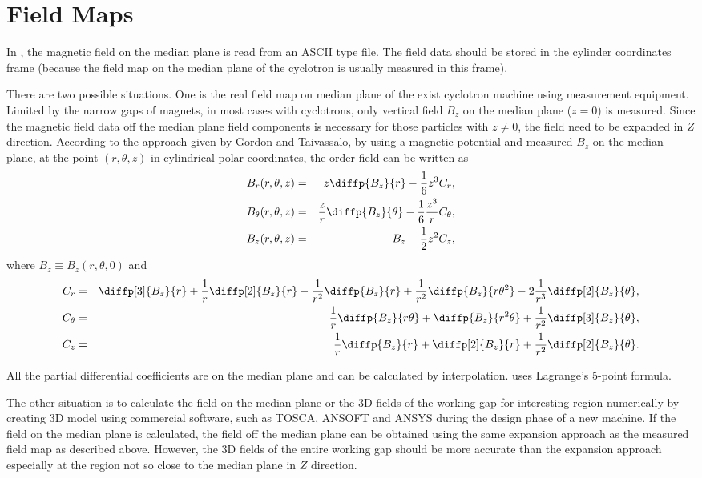 \section{Field Maps}
\label{sec:opalcycl:fildmap}
In \opalcycl, the magnetic field on the median plane is read from an ASCII type file. The field data should be stored in the cylinder coordinates frame (because the field map on the median plane of the cyclotron is usually measured in this frame).

There are two possible situations. One is the real field map on median plane of the exist cyclotron machine using measurement equipment.
Limited by the narrow gaps of magnets, in most cases with cyclotrons, only vertical field $B_z$ on the median plane ($z=0$) is measured.
Since the magnetic field data off the median plane field components is necessary for those particles with $z \neq 0$, the field need to be expanded in $Z$ direction.
According to the approach given by Gordon and Taivassalo, by using a magnetic potential and measured $B_z$ on the median plane,
at the point $(r,\theta, z)$ in cylindrical polar coordinates, the  order field can be written as
\begin{eqnarray}\label{eq:Bfield}
  B_r(r,\theta, z) & = & z\diffp{B_z}{ r}-\frac{1}{6}z^3 C_r, \nonumber\\
  B_\theta(r,\theta, z) & = & \frac{z}{r}\diffp{B_z}{\theta}-\frac{1}{6}\frac{z^3}{r} C_{\theta}, \\
  B_z(r,\theta, z) & = & B_z-\frac{1}{2}z^2 C_z,  \nonumber
\end{eqnarray}
where $B_z\equiv B_z(r, \theta, 0)$ and
\begin{eqnarray}\label{eq:Bcoeff}
  C_r & = & \diffp[3]{B_z}{r} + \frac{1}{r}\diffp[2]{B_z}{r} - \frac{1}{r^2}\diffp{B_z}{r}
        + \frac{1}{r^2}\diffp{B_z}{{r}{\theta^2}} - 2\frac{1}{r^3}\diffp[2]{B_z}{\theta}, \nonumber  \\
  C_{\theta} & = & \frac{1}{r}\diffp{B_z}{{r}{\theta}} + \diffp{B_z}{{r^2}{\theta}}
        + \frac{1}{r^2}\diffp[3]{B_z}{\theta},  \\
  C_z & = & \frac{1}{r}\diffp{B_z}{r} + \diffp[2]{B_z}{r} + \frac{1}{r^2}\diffp[2]{B_z}{\theta}. \nonumber
\end{eqnarray}

All the partial differential coefficients are on the median plane and can be calculated by interpolation. \opalcycl uses  Lagrange's  5-point formula.

The other situation is to calculate the field on the median plane or the 3D fields of the working gap for interesting region numerically by creating 3D model using commercial software,
such as TOSCA, ANSOFT and ANSYS during the design phase of a new machine. If the field on the median plane is calculated, the field off the median plane can be obtained using
the same expansion approach as the measured field map as described above. However, the 3D fields of the entire working gap should be more accurate than
the expansion approach  especially at the region not so close to the median plane in $Z$ direction.

